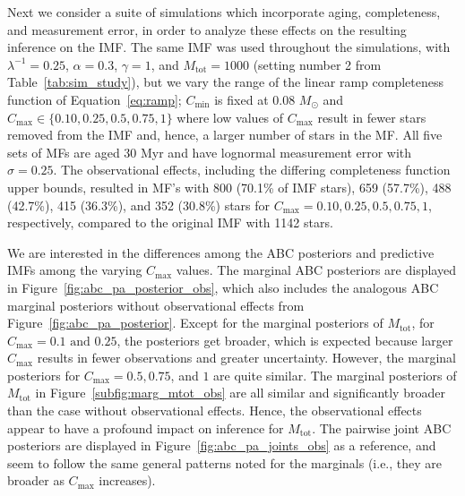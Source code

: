 \documentclass[ejs]{imsart}
\numberwithin{equation}{section}
\theoremstyle{plain}
\newcommand{\Msun}{M_{\odot}}
\newcommand{\Cmin}{C_{\text{min}}}
\newcommand{\Cmax}{C_{\text{max}}}
\newcommand{\Mtot}{M_{\text{tot}}}
\begin{document}
Next we consider a suite of simulations which incorporate
aging, completeness, and measurement error, in order to analyze these effects on the resulting inference on the IMF.  
The same IMF was used throughout the simulations, with
$\lambda^{-1} = 0.25$, $\alpha = 0.3$, $\gamma = 1$, and $\Mtot = 1000$ (setting number 2 from Table~\ref{tab:sim_study}), but we vary the range of the linear ramp completeness function of Equation~\eqref{eq:ramp}; $\Cmin$ is fixed at 0.08 $\Msun$ and $\Cmax \in \{0.10, 0.25, 0.5, 0.75, 1\}$ where low values of $\Cmax$ result in fewer stars removed from the IMF and, hence, a larger number of stars in the MF.  
All five sets of MFs are aged 30 Myr and have lognormal measurement error with $\sigma = 0.25$.  
The observational effects, including the differing completeness function upper bounds, resulted in MF's with 800 (70.1\% of IMF stars), 659 (57.7\%), 488 (42.7\%), 415 (36.3\%), and 352 (30.8\%) stars for $\Cmax = 0.10, 0.25, 0.5, 0.75, 1$, respectively, compared to the original IMF with 1142 stars.

We are interested in the differences among the ABC posteriors and predictive IMFs among the varying $\Cmax$ values.  
The marginal ABC posteriors are displayed in Figure~\ref{fig:abc_pa_posterior_obs}, which also includes the analogous ABC marginal posteriors without observational effects from Figure~\ref{fig:abc_pa_posterior}.  
Except for the marginal posteriors of $\Mtot$, for $\Cmax = 0.1 \text{ and } 0.25$, the posteriors get broader, which is expected because larger $\Cmax$ results in fewer observations and greater uncertainty.  
However, the marginal posteriors for $\Cmax = 0.5, 0.75$, and $1$ are quite similar. The marginal posteriors of $\Mtot$ in Figure~\ref{subfig:marg_mtot_obs} are all similar and significantly broader than the case without observational effects.  Hence, the observational effects appear to have a profound impact on inference for $\Mtot$.  The pairwise joint ABC posteriors are displayed in Figure~\ref{fig:abc_pa_joints_obs} as a reference, and seem to follow the same general patterns noted for the marginals (i.e., they are broader as $\Cmax$ increases).
\end{document}
